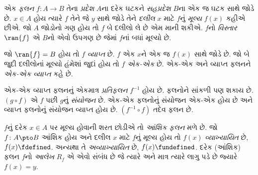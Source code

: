 એક \emph{ફલન} $f\colon A\to B$ તેના \emph{પ્રદેશ} $A$ના દરેક ઘટકને \emph{સહપ્રદેશ} $B$ના એક જ ઘટક સાથે જોડે છે. $x\in A$ હોય ત્યારે $f$ તેને જે $y$ સાથે જોડે તેને \emph{દલીલ} $x$ માટે $f$નું \emph{મૂલ્ય} $f(x)$ કહીએ છીએ. જો $A$ જોડોનો ગણ હોય તો $f$ બે દલીલો લે છે એમ માની શકીએ. $f$નો \emph{વિસ્તાર} $\ran{f}$ એ $B$નો એવો ઉપગણ છે જેમાં $f$નાં બધાં મૂલ્યો છે.

જો $\ran{f}=B$ હોય તો $f$ \emph{વ્યાપ્ત} છે. $f$ એક $x$ને એક જ $f(x)$ સાથે જોડે છે. જો બે જુદી દલીલોનાં મૂલ્યો હંમેશાં જુદાં હોય તો $f$ \emph{એક-એક} છે. એક-એક અને વ્યાપ્ત ફલનને \emph{એક-એક વ્યાપ્ત} કહે છે.

એક-એક વ્યાપ્ત ફલનનું એકમાત્ર \emph{પ્રતિફલન} $f^{-1}$ હોય છે. ફલનોને સાંકળી પણ શકાય છે. $(g\circ f)$ એ $f$ પછી $g$નું \emph{સંયોજન} છે. એક-એક ફલનોનું સંયોજન એક-એક હોય છે અને વ્યાપ્ત ફલનોનું સંયોજન વ્યાપ્ત હોય છે. $(f^{-1}\circ f)$ તદેવ ફલન છે.

$f$નું દરેક $x\in A$ પર મૂલ્ય હોવાની શરત છોડીએ તો \emph{આંશિક ફલન} મળે છે. જો $f\colon A\pto B$ આંશિક હોય અને દલીલ $x$ માટે $f$નું મૂલ્ય હોય તો $f(x)$ \emph{વ્યાખ્યાયિત} છે, $f(x)\fdefined$. અન્યથા તે \emph{અવ્યાખ્યાયિત} છે, $f(x)\fundefined$. દરેક (આંશિક) ફલન $f$નો \emph{આલેખ} $R_f$ એ એવો સંબંધ છે જે ત્યારે અને માત્ર ત્યારે લાગુ પડે છે જ્યારે $f(x)=y$.
